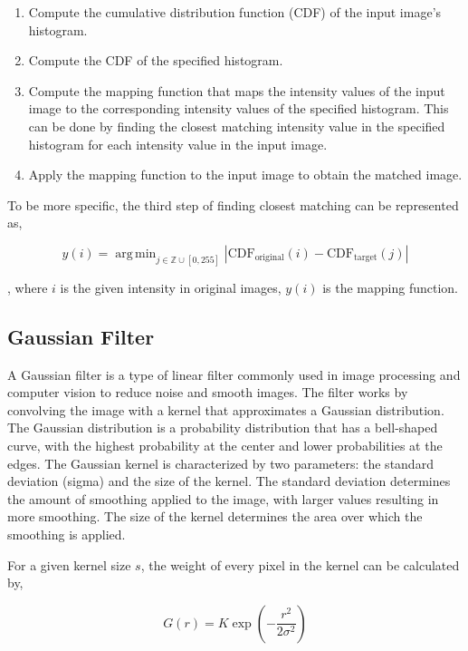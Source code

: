 \documentclass[twocolumn]{extarticle}
\DeclareMathOperator*{\argmin}{arg\,min}
\begin{document}
\begin{enumerate}
\item Compute the cumulative distribution function (CDF) of the input image's histogram.
\item Compute the CDF of the specified histogram.
\item Compute the mapping function that maps the intensity values of the input image to the corresponding intensity values of the specified histogram. This can be done by finding the closest matching intensity value in the specified histogram for each intensity value in the input image.
\item Apply the mapping function to the input image to obtain the matched image.
\end{enumerate}

To be more specific, the third step of finding closest matching can be represented as,

\begin{equation}
y(i) = \argmin_{j\in \mathbb{Z} \cup [0, 255]} \left| \text{CDF}_{\text{original}}(i) - \text{CDF}_{\text{target}}(j) \right| 
\end{equation}

, where $i$ is the given intensity in original images, $y(i)$ is the mapping function.


\subsection{Gaussian Filter}

A Gaussian filter is a type of linear filter commonly used in image processing and computer vision to reduce noise and smooth images. The filter works by convolving the image with a kernel that approximates a Gaussian distribution. The Gaussian distribution is a probability distribution that has a bell-shaped curve, with the highest probability at the center and lower probabilities at the edges. The Gaussian kernel is characterized by two parameters: the standard deviation (sigma) and the size of the kernel. The standard deviation determines the amount of smoothing applied to the image, with larger values resulting in more smoothing. The size of the kernel determines the area over which the smoothing is applied.

For a given kernel size $s$, the weight of every pixel in the kernel can be calculated by, 

\begin{equation}
G(r) = K \exp\left(-\frac{r^2}{2\sigma^2}\right) 
\end{equation}
\end{document}
